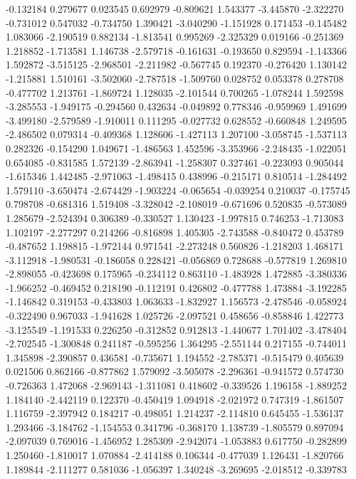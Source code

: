 -0.132184
0.279677
0.023545
0.692979
-0.809621
1.543377
-3.445870
-2.322270
-0.731012
0.547032
-0.734750
1.390421
-3.040290
-1.151928
0.171453
-0.145482
1.083066
-2.190519
0.882134
-1.813541
0.995269
-2.325329
0.019166
-0.251369
1.218852
-1.713581
1.146738
-2.579718
-0.161631
-0.193650
0.829594
-1.143366
1.592872
-3.515125
-2.968501
-2.211982
-0.567745
0.192370
-0.276420
1.130142
-1.215881
1.510161
-3.502060
-2.787518
-1.509760
0.028752
0.053378
0.278708
-0.477702
1.213761
-1.869724
1.128035
-2.101544
0.700265
-1.078244
1.592598
-3.285553
-1.949175
-0.294560
0.432634
-0.049892
0.778346
-0.959969
1.491699
-3.499180
-2.579589
-1.910011
0.111295
-0.027732
0.628552
-0.660848
1.249595
-2.486502
0.079314
-0.409368
1.128606
-1.427113
1.207100
-3.058745
-1.537113
0.282326
-0.154290
1.049671
-1.486563
1.452596
-3.353966
-2.248435
-1.022051
0.654085
-0.831585
1.572139
-2.863941
-1.258307
0.327461
-0.223093
0.905044
-1.615346
1.442485
-2.971063
-1.498415
0.438996
-0.215171
0.810514
-1.284492
1.579110
-3.650474
-2.674429
-1.903224
-0.065654
-0.039254
0.210037
-0.175745
0.798708
-0.681316
1.519408
-3.328042
-2.108019
-0.671696
0.520835
-0.573089
1.285679
-2.524394
0.306389
-0.330527
1.130423
-1.997815
0.746253
-1.713083
1.102197
-2.277297
0.214266
-0.816898
1.405305
-2.743588
-0.840472
0.453789
-0.487652
1.198815
-1.972144
0.971541
-2.273248
0.560826
-1.218203
1.468171
-3.112918
-1.980531
-0.186058
0.228421
-0.056869
0.728688
-0.577819
1.269810
-2.898055
-0.423698
0.175965
-0.234112
0.863110
-1.483928
1.472885
-3.380336
-1.966252
-0.469452
0.218190
-0.112191
0.426802
-0.477788
1.473884
-3.192285
-1.146842
0.319153
-0.433803
1.063633
-1.832927
1.156573
-2.478546
-0.058924
-0.322490
0.967033
-1.941628
1.025726
-2.097521
0.458656
-0.858846
1.422773
-3.125549
-1.191533
0.226250
-0.312852
0.912813
-1.440677
1.701402
-3.478404
-2.702545
-1.300848
0.241187
-0.595256
1.364295
-2.551144
0.217155
-0.744011
1.345898
-2.390857
0.436581
-0.735671
1.194552
-2.785371
-0.515479
0.405639
0.021506
0.862166
-0.877862
1.579092
-3.505078
-2.296361
-0.941572
0.574730
-0.726363
1.472068
-2.969143
-1.311081
0.418602
-0.339526
1.196158
-1.889252
1.184140
-2.442119
0.122370
-0.450419
1.094918
-2.021972
0.747319
-1.861507
1.116759
-2.397942
0.184217
-0.498051
1.214237
-2.114810
0.645455
-1.536137
1.293466
-3.184762
-1.154553
0.341796
-0.368170
1.138739
-1.805579
0.897094
-2.097039
0.769016
-1.456952
1.285309
-2.942074
-1.053883
0.617750
-0.282899
1.250460
-1.810017
1.070884
-2.414188
0.106344
-0.477039
1.126431
-1.820766
1.189844
-2.111277
0.581036
-1.056397
1.340248
-3.269695
-2.018512
-0.339783
